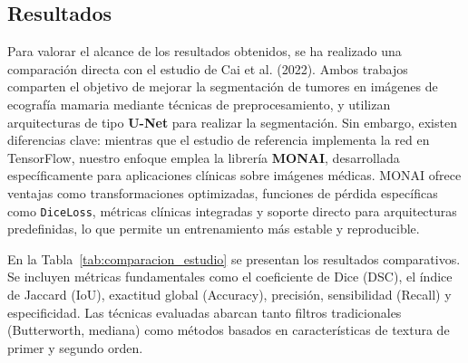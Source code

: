 \documentclass[12pt]{article}
\begin{document}
\subsection{Resultados}

Para valorar el alcance de los resultados obtenidos, se ha realizado una comparación directa con el estudio de Cai et al. (2022).
Ambos trabajos comparten el objetivo de mejorar la segmentación de tumores en imágenes de ecografía mamaria mediante técnicas de preprocesamiento, y utilizan arquitecturas de tipo \textbf{U-Net} para realizar la segmentación. Sin embargo, existen diferencias clave: mientras que el estudio de referencia implementa la red en TensorFlow, nuestro enfoque emplea la librería \textbf{MONAI}, desarrollada específicamente para aplicaciones clínicas sobre imágenes médicas. MONAI ofrece ventajas como transformaciones optimizadas, funciones de pérdida específicas como \texttt{DiceLoss}, métricas clínicas integradas y soporte directo para arquitecturas predefinidas, lo que permite un entrenamiento más estable y reproducible.

En la Tabla~\ref{tab:comparacion_estudio} se presentan los resultados comparativos. Se incluyen métricas fundamentales como el coeficiente de Dice (DSC), el índice de Jaccard (IoU), exactitud global (Accuracy), precisión, sensibilidad (Recall) y especificidad. Las técnicas evaluadas abarcan tanto filtros tradicionales (Butterworth, mediana) como métodos basados en características de textura de primer y segundo orden.
\end{document}
